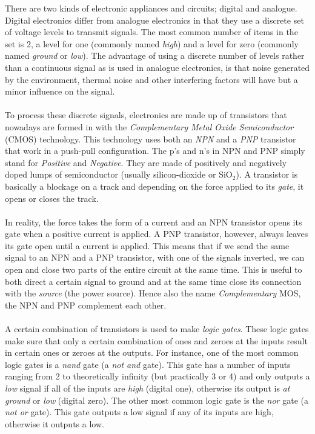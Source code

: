 \documentclass[11pt,british]{article}
\begin{document}
There are two kinds of electronic appliances and circuits; digital and analogue. Digital electronics differ from analogue electronics in that they use a discrete set of voltage levels to transmit signals. The most common number of items in the set is 2, a level for one (commonly
named \emph{high}) and a level for zero (commonly named \emph{ground} or \emph{low}). The advantage of using a discrete number of levels rather than a continuous signal as is used in analogue electronics, is that noise generated by the environment, thermal noise and other interfering factors will have but a minor influence on the signal.
\\
\\
To process these discrete signals, electronics are made up of transistors that nowadays are formed in with the \emph{Complementary Metal Oxide Semiconductor }(CMOS) technology. This technology uses both an \emph{NPN} and a \emph{PNP} transistor that work in a push-pull configuration. The p's and n's in NPN and PNP simply stand for \emph{Positive} and \emph{Negative}. They are made of positively and negatively doped lumps of semiconductor (usually silicon-dioxide or SiO$_{2}$). A transistor is basically a blockage on a track and depending on the force applied to its \emph{gate}, it opens or closes the track.
\\
\\
In reality, the force takes the form of a current and an NPN transistor opens its gate when a positive current is applied. A PNP transistor, however, always leaves its gate open until a current is applied. This means that if we send the same signal to an NPN and a PNP transistor, with one of the signals inverted, we can open and close two parts of the entire circuit at the same time. This is useful to both direct a certain signal to ground and at the same time close its connection with the \emph{source} (the power source). Hence also the name \emph{Complementary} MOS, the NPN and PNP complement each other.
\\
\\
A certain combination of transistors is used to make \emph{logic gates}. These logic gates make sure that only a certain combination of ones and zeroes at the inputs result in certain ones or zeroes at the outputs. For instance, one of the most common logic gates is a \emph{nand }gate (a \emph{not and }gate). This gate has a number of inputs ranging from 2 to theoretically infinity (but practically 3 or 4) and only outputs a \emph{low} signal if all of the inputs are \emph{high} (digital one), otherwise its output is \emph{at ground} or \emph{low} (digital zero). The other most common logic gate is the \emph{nor }gate (a \emph{not or }gate). This gate outputs a low signal if any of its inputs are high, otherwise it outputs a low.
\end{document}

